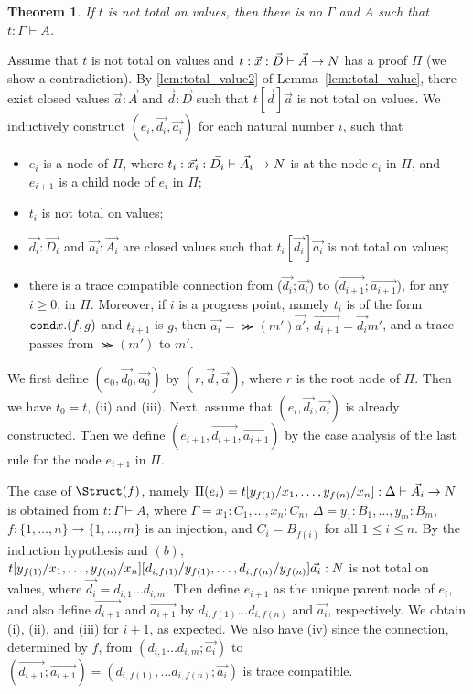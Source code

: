 \documentclass{article}
\newtheorem{theorem}{Theorem}[section]
\newenvironment{proof}[1][Proof]{\begin{trivlist}
\item[\hskip \labelsep {\bfseries #1}]}{\end{trivlist}}
\begin{document}
\begin{theorem}
  If $t$ is not total on values, then there is no $\Gamma$ and $A$ such that $t: \Gamma\vdash A$. 
\end{theorem}
\begin{proof}
  Assume that $t$ is not total on values
  and $t: \vec{x}:\vec{D}\vdash\vec{A}\rightarrow{N}$ has a proof $\Pi$ (we show a contradiction).
  By \ref{lem:total_value2} of Lemma~\ref{lem:total_value},
  there exist closed values $\vec{a}:\vec{A}$ and $\vec{d}:\vec{D}$ such that
  $t[\vec{d}]\vec{a}$ is not total on values. 
  We inductively construct $(e_i,\vec{d_i},\vec{a_i})$ for each natural number $i$,
  such that
  \begin{itemize}
  \item[(i)]
    $e_i$ is a node of $\Pi$, where $t_i: \vec{x_i}:\vec{D_i}\vdash\vec{A_i}\rightarrow{N}$ is
    at the node $e_i$ in $\Pi$, and $e_{i+1}$ is a child node of $e_i$ in $\Pi$; 
  \item[(ii)]
    $t_i$ is not total on values;
  \item[(iii)]
    $\vec{d_i}:\vec{D_i}$ and $\vec{a_i}:\vec{A_i}$ are closed values
    such that $t_i[\vec{d_i}]\vec{a_i}$ is not total on values;
  \item[(iv)]
    there is a trace compatible connection from
    ($\vec{d_i};\vec{a_i}$) to ($\vec{d_{i+1}};\vec{a_{i+1}}$), for any $i\ge 0$, in $\Pi$.
    Moreover, if $i$ is a progress point, namely $t_i$ is of the form ${\tt cond} x.(f,g)$ and $t_{i+1}$ is $g$,
    then $\vec{a_i} = \Succ(m')\vec{a'}$, $\vec{d_{i+1}} = \vec{d_i}m'$, and
    a trace passes from $\Succ(m')$ to $m'$. 
  \end{itemize}
  
  We first define $(e_0,\vec{d_0},\vec{a_0})$ by $(r,\vec{d},\vec{a})$,
  where $r$ is the root node of $\Pi$. Then we have $t_0 = t$, (ii) and (iii). 
  Next, assume that $(e_i,\vec{d_i},\vec{a_i})$ is already constructed.
  Then we define $(e_{i+1},\vec{d_{i+1}},\vec{a_{i+1}})$ by the case analysis of
  the last rule for the node $e_{i+1}$ in $\Pi$. 

  The case of $\Struct(f)$, namely
  $\Pi(e_i) = t[y_{f(1)}/x_1,\ldots,y_{f(n)}/x_n]:\Delta\vdash \vec{A_i}\rightarrow{N}$
  is obtained from $t:\Gamma\vdash A$, where
  $\Gamma = x_1:C_1,\ldots,x_n:C_n$, $\Delta = y_1:B_1,\ldots,y_m:B_m$, 
  $f:\{1,\ldots,n\}\to\{1,\ldots,m\}$ is an injection, and $C_i=B_{f(i)}$ for all $1\le i\le n$.
  By the induction hypothesis and $(b)$,
  $t[y_{f(1)}/x_1,\ldots,y_{f(n)}/x_n][d_{i,f(1)}/y_{f(1)},\ldots,d_{i,f(n)}/y_{f(n)}]\vec{a_i}:{N}$ is not total on values, where $\vec{d_i} = d_{i,1}\ldots d_{i,m}$.
  Then define $e_{i+1}$ as the unique parent node of $e_i$, and
  also define $\vec{d_{i+1}}$ and $\vec{a_{i+1}}$ by $d_{i,f(1)}\ldots d_{i,f(n)}$
  and $\vec{a_i}$, respectively. 
  We obtain (i), (ii), and (iii) for $i+1$, as expected.
  We also have (iv) since the connection, determined by $f$, from
  $(d_{i,1}\ldots d_{i,m};\vec{a_i})$ to $(\vec{d_{i+1}};\vec{a_{i+1}}) = (d_{i,f(1)},\ldots d_{i,f(n)};\vec{a_i})$
  is trace compatible. 


\end{proof}
\end{document}
